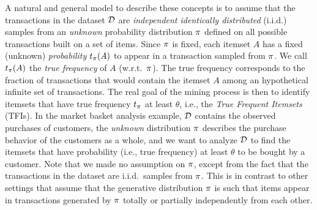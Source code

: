 A natural and general model to describe these concepts 
is to assume that the transactions in the dataset ${\cal D}$ are \emph{independent
identically distributed} (i.i.d.) samples from an \emph{unknown} probability
distribution $\pi$ defined on all possible transactions built on a set of
items. Since $\pi$ is fixed, each itemset $A$ has a fixed (unknown) \emph{probability}
$t_\pi(A)$ to appear in a transaction sampled from $\pi$. We call $t_\pi(A)$ the
\emph{true frequency} of $A$ (w.r.t.~$\pi$). The true frequency corresponds
to the fraction of transactions that would contain the itemset $A$ among an
hypothetical infinite set of transactions. The real goal of the mining process is then to identify
itemsets that have
true frequency $t_\pi$ at least $\theta$, i.e., the \emph{True Frequent
Itemsets} (TFIs). In the market basket analysis example, ${\cal D}$ contains the
observed purchases of customers, the \emph{unknown} distribution $\pi$
describes the purchase behavior of the customers as a whole, and we want to
analyze ${\cal D}$ to find the itemsets that have probability (i.e., true frequency)
at least $\theta$ to be bought by a customer. Note that we made no assumption on
$\pi$, except from the fact that the transactions in the dataset are
i.i.d.~samples from $\pi$. This is in contrast to other settings that assume
that the generative distribution $\pi$ is such that items appear in
transactions generated by $\pi$ totally or partially independently from each
other.

